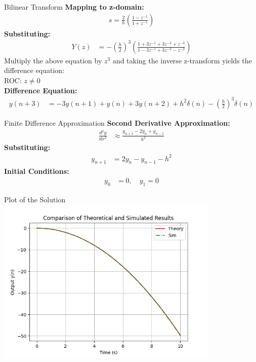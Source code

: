 \documentclass{beamer}
\begin{document}
\begin{frame}{Bilinear Transform}
	\textbf{Mapping to z-domain:}
	\begin{align}
		s = \frac{2}{h} \left(\frac{1 - z^{-1}}{1 + z^{-1}} \right)
	\end{align}
	\textbf{Substituting:}
	\begin{align}
		Y(z) &= -\left(\frac{h}{2}\right)^3 \left(\frac{1 + 3z^{-1} + 3z^{-2} + z^{-3}}{1 - 3z^{-1} + 3z^{-2} - z^{-3}} \right)
	\end{align}
	Multiply the above equation by $z^3$ and taking the inverse z-transform yields the difference equation: \\
	ROC: $z \neq 0$ \\
	\textbf{Difference Equation:}
	\begin{align}
		y(n+3) &= -3y(n+1) + y(n) + 3y(n+2) + h^2\delta(n) - \left(\frac{h}{2}\right)^3\delta(n)
	\end{align}
\end{frame}

\begin{frame}{Finite Difference Approximation}
	\textbf{Second Derivative Approximation:}
	\begin{align}
		\frac{d^2y}{dx^2} &\approx \frac{y_{n+1} - 2y_n + y_{n-1}}{h^2}
	\end{align}
	\textbf{Substituting:}
	\begin{align}
		y_{n+1} &= 2y_n - y_{n-1} - h^2
	\end{align}
	\textbf{Initial Conditions:}
	\begin{align}
		y_0 &= 0, \quad y_1 = 0
	\end{align}
\end{frame}

\begin{frame}{Plot of the Solution}
	\centering
	\includegraphics[width=0.8\textwidth]{figs/fig.png}
\end{frame}
\end{document}
